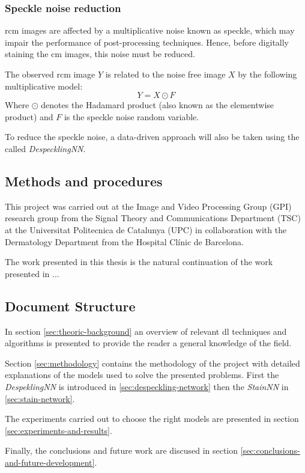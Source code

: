 \documentclass[../main.tex]{subfiles}
\begin{document}
% 
% 
% 

\subsubsection{Speckle noise reduction}
\gls{rcm} images are affected by a multiplicative noise known as speckle,
which may impair the performance of post-processing techniques.
Hence, before digitally staining the \gls{cm} images, this noise must be reduced.

The observed \gls{rcm} image $Y$ is related to the noise free image $X$ by
the following multiplicative model:
\begin{equation} \label{eq:speckle-model}
	Y = X \odot F
\end{equation}
Where $\odot$ denotes the Hadamard product (also known as the elementwise product)
and $F$ is the speckle noise random variable.

To reduce the speckle noise, a data-driven approach will also be taken using
the called \emph{DespecklingNN}.

\subsection{Methods and procedures}
\label{sec:methods-and-procedures}
This project was carried out at the Image and Video Processing Group (GPI) research
group from the Signal Theory and Communications Department (TSC) at the Universitat
Politecnica de Catalunya (UPC) in collaboration with the Dermatology Department from
the Hospital Clínic de Barcelona.

The work presented in this thesis is the natural continuation of the work presented
in \cite{Combalia2019}...

\subsection{Document Structure}
In section \ref{sec:theoric-background} an overview of relevant \gls{dl} techniques and algorithms
is presented to provide the reader a general knowledge of the field.

Section \ref{sec:methodology} contains the methodology of the project with detailed
explanations of the models used to solve the presented problems. First the
\emph{DespeklingNN} is introduced in \ref{sec:despeckling-network} then the
\emph{StainNN} in \ref{sec:stain-network}.

The experiments carried out to choose the right models are presented in section
\ref{sec:experiments-and-results}.

Finally, the conclusions and future work are discused in section
\ref{sec:conclusions-and-future-development}.
\end{document}

